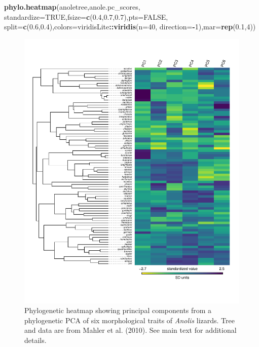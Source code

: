 \documentclass[fleqn,10pt,lineno]{wlpeerj} %
\newenvironment{Shaded}{\begin{snugshade}}{\end{snugshade}}
\newcommand{\AttributeTok}[1]{\textcolor[rgb]{0.13,0.29,0.53}{#1}}
\newcommand{\ConstantTok}[1]{\textcolor[rgb]{0.56,0.35,0.01}{#1}}
\newcommand{\DecValTok}[1]{\textcolor[rgb]{0.00,0.00,0.81}{#1}}
\newcommand{\FloatTok}[1]{\textcolor[rgb]{0.00,0.00,0.81}{#1}}
\newcommand{\FunctionTok}[1]{\textcolor[rgb]{0.13,0.29,0.53}{\textbf{#1}}}
\newcommand{\NormalTok}[1]{#1}
\newcommand{\SpecialCharTok}[1]{\textcolor[rgb]{0.81,0.36,0.00}{\textbf{#1}}}
\begin{document}
\begin{Shaded}
\begin{Highlighting}[]
\FunctionTok{phylo.heatmap}\NormalTok{(anoletree,anole.pc\_scores,}
  \AttributeTok{standardize=}\ConstantTok{TRUE}\NormalTok{,}\AttributeTok{fsize=}\FunctionTok{c}\NormalTok{(}\FloatTok{0.4}\NormalTok{,}\FloatTok{0.7}\NormalTok{,}\FloatTok{0.7}\NormalTok{),}\AttributeTok{pts=}\ConstantTok{FALSE}\NormalTok{,}
  \AttributeTok{split=}\FunctionTok{c}\NormalTok{(}\FloatTok{0.6}\NormalTok{,}\FloatTok{0.4}\NormalTok{),}\AttributeTok{colors=}\NormalTok{viridisLite}\SpecialCharTok{::}\FunctionTok{viridis}\NormalTok{(}\AttributeTok{n=}\DecValTok{40}\NormalTok{,}
  \AttributeTok{direction=}\SpecialCharTok{{-}}\DecValTok{1}\NormalTok{),}\AttributeTok{mar=}\FunctionTok{rep}\NormalTok{(}\FloatTok{0.1}\NormalTok{,}\DecValTok{4}\NormalTok{))}
\end{Highlighting}
\end{Shaded}

\begin{figure}
\includegraphics[width=1\linewidth]{Revell.phytools-v2_peerj_files/figure-latex/fig22-anole-heatmap-1} \caption{Phylogenetic heatmap showing principal components from a phylogenetic PCA of six morphological traits of \textit{Anolis} lizards. Tree and data are from Mahler et al. (2010). See main text for additional details.}\label{fig:fig22-anole-heatmap}
\end{figure}
\end{document}

